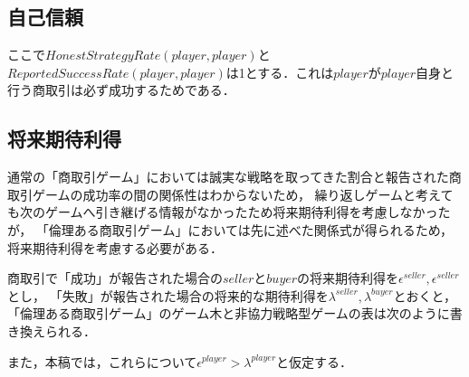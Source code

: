 \subsection{自己信頼}
ここで$ HonestStrategyRate(player, player) $と$ ReportedSuccessRate(player, player) $は1とする．これは$ player $が$ player $自身と行う商取引は必ず成功するためである．

\subsection{将来期待利得}
通常の「商取引ゲーム」においては誠実な戦略を取ってきた割合と報告された商取引ゲームの成功率の間の関係性はわからないため，
繰り返しゲームと考えても次のゲームへ引き継げる情報がなかったため将来期待利得を考慮しなかったが，
「倫理ある商取引ゲーム」においては先に述べた関係式が得られるため，
将来期待利得を考慮する必要がある．

商取引で「成功」が報告された場合の$ seller $と$ buyer $の将来期待利得を$ \epsilon^{seller}, \epsilon^{seller} $とし，
「失敗」が報告された場合の将来的な期待利得を$ \lambda^{seller}, \lambda^{buyer} $とおくと，
「倫理ある商取引ゲーム」のゲーム木と非協力戦略型ゲームの表は次のように書き換えられる．

また，本稿では，これらについて$ \epsilon^{player} > \lambda^{player} $と仮定する．
